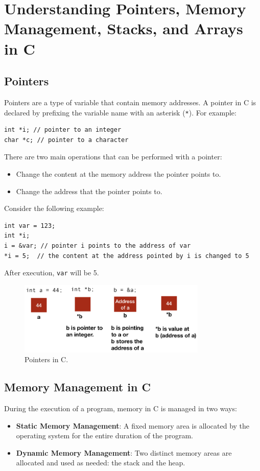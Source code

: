 \section{Understanding Pointers, Memory Management, Stacks, and Arrays in C}

\subsection{Pointers}
Pointers are a type of variable that contain memory addresses. A pointer in C is declared by prefixing the variable name with an asterisk (\texttt{*}). For example:
\begin{lstlisting}
int *i; // pointer to an integer
char *c; // pointer to a character
\end{lstlisting}

There are two main operations that can be performed with a pointer:
\begin{itemize}
    \item Change the content at the memory address the pointer points to.
    \item Change the address that the pointer points to.
\end{itemize}

\noindent Consider the following example:
\begin{lstlisting}
int var = 123;
int *i;
i = &var; // pointer i points to the address of var
*i = 5;  // the content at the address pointed by i is changed to 5
\end{lstlisting}

After execution, \texttt{var} will be 5.

\begin{figure}[h!]
    \centering
    \includegraphics[width=0.8\textwidth]{images/pointers_c.png}
    \caption{Pointers in C.}
\end{figure}

\subsection{Memory Management in C}
During the execution of a program, memory in C is managed in two ways:
\begin{itemize}
    \item \textbf{Static Memory Management}: A fixed memory area is allocated by the operating system for the entire duration of the program.
    \item \textbf{Dynamic Memory Management}: Two distinct memory areas are allocated and used as needed: the stack and the heap.
\end{itemize}

